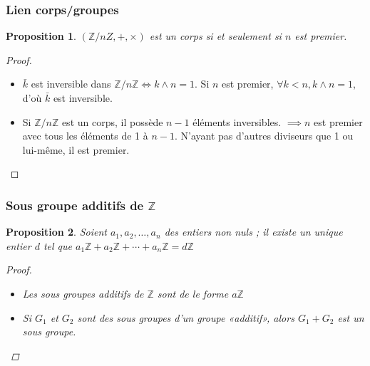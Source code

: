 \documentclass[french]{beamer}
\newtheorem{proposition}{Proposition}
\newcommand{\Z}{\mathbb{Z}}
\begin{document}
\begin{frame}
  \frametitle{Lien corps/groupes}
  \begin{proposition}
    $(\Z/nZ,+,\times)$ est un corps si et seulement si $n$ est premier.
  \end{proposition}
  \begin{proof}
    \begin{itemize}
      \item $\bar{k}$ est inversible dans $\Z/n\Z \iff k\wedge n = 1$.
        Si $n$ est premier, $\forall k < n, k\wedge n = 1$, d'où
        $\bar{k}$ est inversible.
      \item Si $\Z/n\Z$ est un corps, il possède $n-1$ éléments
        inversibles. $\implies n$ est premier avec tous les éléments de
        1 à $n-1$. N'ayant pas d'autres diviseurs que 1 ou lui-même, il
        est premier.
    \end{itemize}
  \end{proof}
\end{frame}

\begin{frame}
  \frametitle{Sous groupe additifs de $\Z$}
  \begin{proposition}
    Soient $a_1, a_2, …, a_n$ des entiers non nuls ; il existe un unique
    entier $d$ tel que $a_1\Z + a_2\Z + \cdots + a_n\Z = d\Z$
    \begin{proof}
      \begin{itemize}
        \item Les sous groupes additifs de $\Z$ sont de le forme $a\Z$
        \item Si $G_1$ et $G_2$ sont des sous groupes d'un groupe
          «additif», alors $G_1 + G_2$ est un sous groupe.
      \end{itemize}
    \end{proof}
  \end{proposition}
\end{frame}
\end{document}
